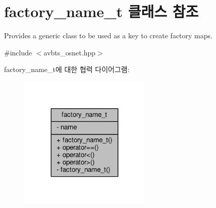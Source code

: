 \hypertarget{classfactory__name__t}{}\section{factory\+\_\+name\+\_\+t 클래스 참조}
\label{classfactory__name__t}


Provides a generic class to be used as a key to create factory maps.  




{\ttfamily \#include $<$avbts\+\_\+osnet.\+hpp$>$}



factory\+\_\+name\+\_\+t에 대한 협력 다이어그램\+:
\nopagebreak
\begin{figure}[H]
\begin{center}
\leavevmode
\includegraphics[width=179pt]{classfactory__name__t__coll__graph}
\end{center}
\end{figure}
